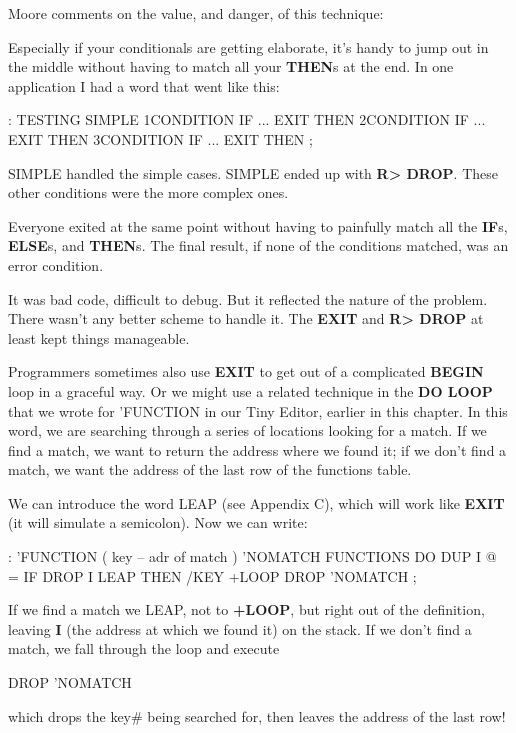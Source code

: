 \bigskip\blackline{2ex}
\noindent Moore comments on the value, and danger, of this technique:
\begin{tfquot}
Especially if your conditionals are getting elaborate, it's handy to jump out
in the middle without having to match all your \textbf{THEN}s at the end. In one
application I had a word that went like this:

\begin{Code}
: TESTING
   SIMPLE  1CONDITION IF ... EXIT THEN
           2CONDITION IF ... EXIT THEN
           3CONDITION IF ... EXIT THEN ;
\end{Code}
SIMPLE handled the simple cases. SIMPLE ended up with \textbf{R> DROP}.
These other conditions were the more complex ones.

Everyone exited at the same point without having to painfully match all
the \textbf{IF}s, \textbf{ELSE}s, and \textbf{THEN}s. The final result, if none of the
conditions matched, was an error condition.

It was bad code, difficult to debug. But it reflected the nature of the
problem. There wasn't any better scheme to handle it. The \textbf{EXIT} and
\textbf{R> DROP} at least kept things manageable.
\end{tfquot}\blackline{1ex}
Programmers sometimes also use \textbf{EXIT} to get out of a complicated
\textbf{BEGIN} loop in a graceful way. Or we might use a related technique in the
\textbf{DO LOOP} that we wrote for 'FUNCTION in our Tiny Editor, earlier in
this chapter. In this word, we are searching through a series of locations
looking for a match. If we find a match, we want to return the address
where we found it; if we don't find a match, we want the address of the
last row of the functions table.

We can introduce the word LEAP (see Appendix C), which will work
like \textbf{EXIT} (it will simulate a semicolon). Now we can write:

\begin{Code}
: 'FUNCTION  ( key -- adr of match )
   'NOMATCH FUNCTIONS DO  DUP  I @ =  IF  DROP I LEAP
   THEN  /KEY +LOOP  DROP  'NOMATCH ;
\end{Code}
If we find a match we LEAP, not to \textbf{+LOOP}, but right out of the definition,
leaving \textbf{I} (the address at which we found it) on the stack. If we don't
find a match, we fall through the loop and execute

\begin{Code}
DROP  'NOMATCH
\end{Code}
which drops the key\# being searched for, then leaves the address of the
last row!


